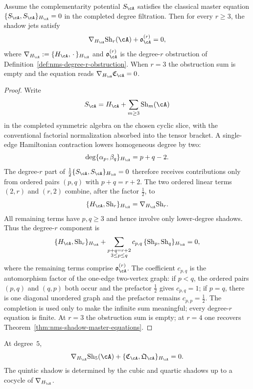 \begin{theorem}
\label{thm:nms-all-degree-master-equation}
Assume the complementarity potential $S_{\cA}$ satisfies the classical master equation $\{S_{\cA},S_{\cA}\}_{H_{\cA}}=0$ in the completed degree filtration. Then for every $r\ge 3$, the shadow jets satisfy
\begin{equation}
\label{eq:nms-all-degree-master-equation}
\nabla_{H_{\cA}}\mathrm{Sh}_r(\cA) + \mathfrak o_{\cA}^{(r)} = 0,
\end{equation}
where $\nabla_{H_{\cA}}:=\{H_{\cA},\,\cdot\,\}_{H_{\cA}}$ and $\mathfrak o_{\cA}^{(r)}$ is the degree-$r$ obstruction of Definition~\ref{def:nms-degree-r-obstruction}. When $r=3$ the obstruction sum is empty and the equation reads $\nabla_{H_{\cA}}\mathfrak C_{\cA}=0$.
\end{theorem}

\begin{proof}
Write
\[
S_{\cA}=H_{\cA}+\sum_{m\ge 3}\mathrm{Sh}_m(\cA)
\]
in the completed symmetric algebra on the chosen cyclic slice, with the conventional factorial normalization absorbed into the tensor bracket. A single-edge Hamiltonian contraction lowers homogeneous degree by two:
\[
\deg\{\alpha_p,\beta_q\}_{H_{\cA}}=p+q-2.
\]
The degree-$r$ part of $\frac12\{S_{\cA},S_{\cA}\}_{H_{\cA}}=0$ therefore receives contributions only from ordered pairs $(p,q)$ with $p+q=r+2$. The two ordered linear terms $(2,r)$ and $(r,2)$ combine, after the factor $\frac12$, to
\[
\{H_{\cA},\mathrm{Sh}_r\}_{H_{\cA}}
=\nabla_{H_{\cA}}\mathrm{Sh}_r.
\]
All remaining terms have $p,q\ge 3$ and hence involve only lower-degree shadows. Thus the degree-$r$ component is
\[
\{H_{\cA},\mathrm{Sh}_r\}_{H_{\cA}}
+
\sum_{\substack{p+q=r+2 \\ 3\le p\le q}}
c_{p,q}\,
\{\mathrm{Sh}_p,\mathrm{Sh}_q\}_{H_{\cA}}
= 0,
\]
where the remaining terms comprise $\mathfrak o_{\cA}^{(r)}$. The coefficient $c_{p,q}$ is the automorphism factor of the one-edge two-vertex graph: if $p<q$, the ordered pairs $(p,q)$ and $(q,p)$ both occur and the prefactor $\frac12$ gives $c_{p,q}=1$; if $p=q$, there is one diagonal unordered graph and the prefactor remains $c_{p,p}=\frac12$. The completion is used only to make the infinite sum meaningful; every degree-$r$ equation is finite. At $r=3$ the obstruction sum is empty; at $r=4$ one recovers Theorem~\ref{thm:nms-shadow-master-equations}.\qedhere
\end{proof}

\begin{corollary}
\label{cor:nms-quintic-master-equation}
At degree~$5$,
\begin{equation}
\label{eq:nms-quintic-master-equation}
\nabla_{H_{\cA}}\mathrm{Sh}_5(\cA)
+
\{\mathfrak C_{\cA},\mathfrak Q_{\cA}\}_{H_{\cA}}
= 0.
\end{equation}
The quintic shadow is determined by the cubic and quartic shadows up to a cocycle of $\nabla_{H_{\cA}}$.
\end{corollary}

